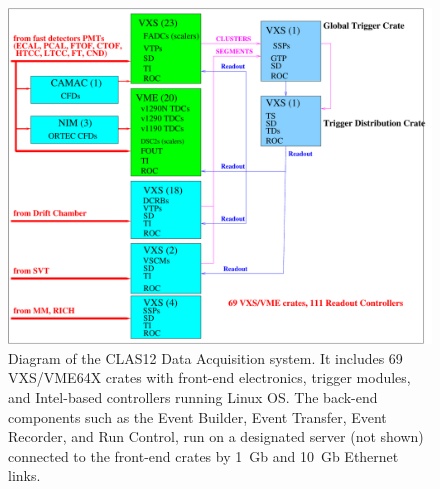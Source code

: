 \begin{figure}[hbt]
	\centering
	\includegraphics[width=1.0\columnwidth,keepaspectratio]{img/CLAS12_HARDWARE_2.pdf}
	\caption{Diagram of the CLAS12 Data Acquisition system. It includes 69 VXS/VME64X crates with front-end
          electronics, trigger modules, and Intel-based controllers running Linux OS. The back-end components such as
          the Event Builder, Event Transfer, Event Recorder, and Run Control, run on a designated server (not shown)
          connected to the front-end crates by 1~Gb and 10~Gb Ethernet links.}
	\label{fig:DAQdiagram}
\end{figure}

